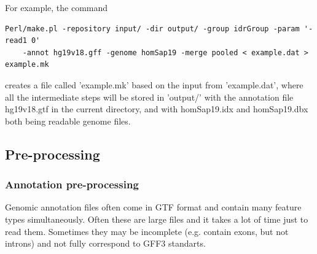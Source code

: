 \documentclass{article}
\begin{document}
For example, the command
\begin{verbatim}
Perl/make.pl -repository input/ -dir output/ -group idrGroup -param '-read1 0' 
	-annot hg19v18.gff -genome homSap19 -merge pooled < example.dat > example.mk
\end{verbatim}
creates a file called 'example.mk' based on the input from 'example.dat', where all the intermediate steps will be stored in 'output/' 
with the annotation file hg19v18.gtf in the current directory, and with homSap19.idx and homSap19.dbx both being readable genome files.


\subsection{Pre-processing}

\subsubsection{Annotation pre-processing}
\label{sec::preprocessing}

Genomic annotation files often come in GTF format and contain many feature types simultaneously. Often these are large files and it takes a lot of 
time just to read them. Sometimes they may be incomplete (e.g. contain exons, but not introns) and not fully correspond to GFF3 standarts.
\end{document}
